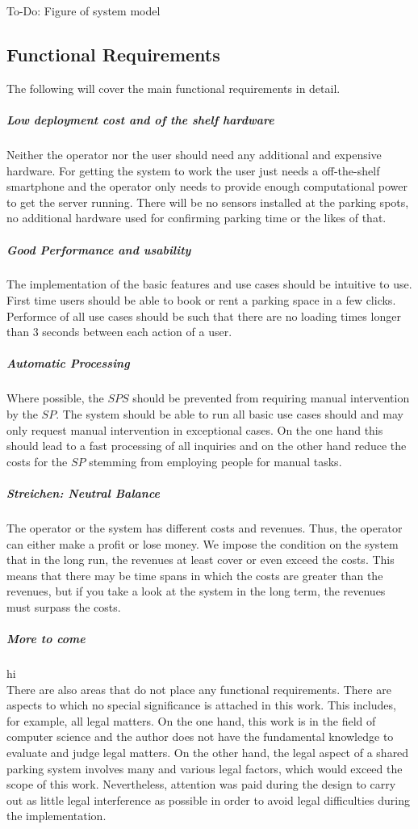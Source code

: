 \documentclass[
a4paper,     %
titlepage,   %
14pt         %
]{scrartcl}  %
\theoremstyle{mystyle}
\begin{document}
To-Do: Figure of system model

\subsection{Functional Requirements}
The following will cover the main functional requirements in detail.
\subparagraph{Low deployment cost and of the shelf hardware} Neither the operator nor the user should need any additional and expensive hardware. For getting the system to work the user just needs a off-the-shelf smartphone and the operator only needs to provide enough computational power to get the server running. There will be no sensors installed at the parking spots, no additional hardware used for confirming parking time or the likes of that.
\subparagraph{Good Performance and usability} The implementation of the basic features and use cases should be intuitive to use. First time users should be able to book or rent a parking space in a few clicks. Performce of all use cases should be such that there are no loading times longer than 3 seconds between each action of a user.
\subparagraph{Automatic Processing} Where possible, the $SPS$ should be prevented from requiring manual intervention by the $SP$. The system should be able to run all basic use cases should and may only request manual intervention in exceptional cases. On the one hand this should lead to a fast processing of all inquiries and on the other hand reduce the costs for the $SP$ stemming from employing people for manual tasks.
\subparagraph{Streichen: Neutral Balance} The operator or the system has different costs and revenues. Thus, the operator can either make a profit or lose money. We impose the condition on the system that in the long run, the revenues at least cover or even exceed the costs. This means that there may be time spans in which the costs are greater than the revenues, but if you take a look at the system in the long term, the revenues must surpass the costs.

\subparagraph{More to come}hi\\

There are also areas that do not place any functional requirements. There are aspects to which no special significance is attached in this work. This includes, for example, all legal matters. On the one hand, this work is in the field of computer science and the author does not have the fundamental knowledge to evaluate and judge legal matters. On the other hand, the legal aspect of a shared parking system involves many and various legal factors, which would exceed the scope of this work. Nevertheless, attention was paid during the design to carry out as little legal interference as possible in order to avoid legal difficulties during the implementation.
\end{document}
